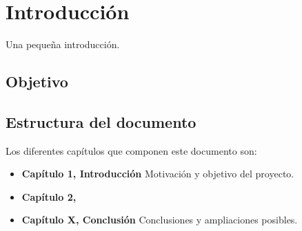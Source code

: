 \chapter{Introducción}
\label{cap:introduccion}

Una pequeña introducción.

\section{Objetivo}

\section{Estructura del documento}

Los diferentes capítulos que componen este documento son:

\begin{itemize}
    \item \textbf{Capítulo 1, Introducción} Motivación y objetivo del proyecto.
    \item \textbf{Capítulo 2, }
    \item \textbf{Capítulo X, Conclusión} Conclusiones y ampliaciones posibles.
\end{itemize}